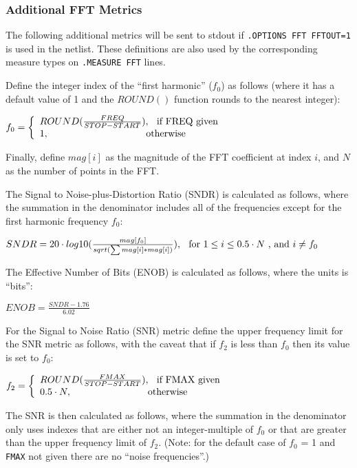 \subsubsection{Additional FFT Metrics}
\label{FFT_metrics}
The following additional metrics will be sent to stdout if \texttt{.OPTIONS FFT FFTOUT=1}
is used in the netlist.  These definitions are also used by the corresponding measure
types on \texttt{.MEASURE FFT} lines.

Define the integer index of the ``first harmonic'' ($f_{0}$) as follows (where it has a
default value of 1 and the $ROUND()$ function rounds to the nearest integer):

$f_{0}=\left\{\begin{array}{ll}ROUND(\frac{FREQ}{STOP-START}),\hspace*{0.1in}\textrm{if FREQ given} \\
 1,\hspace*{1.4in}\textrm{otherwise}\end{array}\right.$

Finally, define $mag[i]$ as the magnitude of the FFT coefficient at index $i$, and $N$ as
the number of points in the FFT.

The Signal to Noise-plus-Distortion Ratio (SNDR) is calculated as follows, where the summation
in the denominator includes all of the frequencies except for the first harmonic frequency $f_{0}$:

$SNDR = 20 \cdot log10(\frac{mag[f_{0}]}{sqrt(\sum mag[i]*mag[i])}),\hspace*{0.1in}\textrm{for}~1 \leq i \leq 0.5 \cdot N ~\textrm{, and}~i \neq f_{0}$

The Effective Number of Bits (ENOB) is calculated as follows, where the units is ``bits'':

$ENOB = \frac{SNDR - 1.76}{6.02}$

For the Signal to Noise Ratio (SNR) metric define the upper frequency limit for the SNR metric as follows,
with the caveat that if $f_{2}$ is less than $f_{0}$ then its value is set to $f_{0}$:

$f_{2}=\left\{\begin{array}{ll}ROUND(\frac{FMAX}{STOP-START}),\hspace*{0.1in}\textrm{if FMAX given}\\
   0.5 \cdot N,\hspace*{1.1in}\textrm{otherwise}\end{array}\right.$

The SNR is then calculated as follows, where the summation in the denominator only uses indexes that
are either not an integer-multiple of $f_{0}$ or that are greater than the upper frequency limit of $f_{2}$.
(Note: for the default case of $f_{0}$ = 1 and \texttt{FMAX} not given there are no ``noise frequencies''.)


